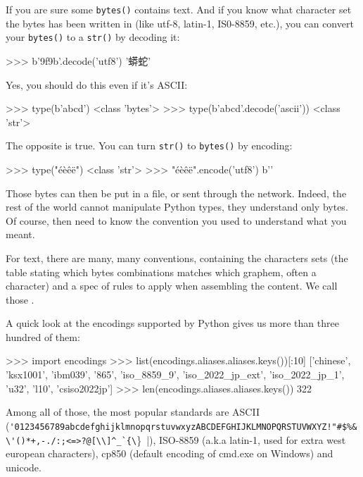 If you are sure some \lstinline{bytes()} contains text. And if you know what character set the bytes has been written in (like utf-8, latin-1, IS0-8859, etc.), you can convert your \lstinline{bytes()} to a \lstinline{str()} by decoding it:

\begin{py3}
>>> b'\x9f\x9b'.decode('utf8')
'蟒蛇'
\end{py3}

Yes, you should do this even if it's ASCII:

\begin{py3}
>>> type(b'abcd')
<class 'bytes'>
>>> type(b'abcd'.decode('ascii'))
<class 'str'>
\end{py3}

The opposite is true. You can turn \lstinline{str()} to \lstinline{bytes()} by encoding:

\begin{py3}
>>> type("éèêë")
<class 'str'>
>>> "éèêë".encode('utf8')
b'\xaa{}\xab'
\end{py3}

Those bytes can then be put in a file, or sent through the network. Indeed, the rest of the world cannot manipulate Python types, they understand only bytes. Of course, then need to know the convention you used to understand what you meant.

For text, there are many, many conventions, containing the characters sets (the table stating which bytes combinations matches which graphem, often a character) and a spec of rules to apply when assembling the content. We call those .

A quick look at the encodings supported by Python gives us more than three hundred of them:

\begin{py3}
>>> import encodings
>>> list(encodings.aliases.aliases.keys())[:10]
['chinese', 'ksx1001', 'ibm039', '865', 'iso_8859_9', 'iso_2022_jp_ext', 'iso_2022_jp_1', 'u32', 'l10', 'csiso2022jp']
>>> len(encodings.aliases.aliases.keys())
322
\end{py3}

Among all of those, the most popular standards are ASCII (\lstinline|'0123456789abcdefghijklmnopqrstuvwxyzABCDEFGHIJKLMNOPQRSTUVWXYZ!"#$%&\'()*+,-./:;<=>?@[\\]^_`{\|\}~|), ISO-8859 (a.k.a latin-1, used for extra west european characters), cp850 (default encoding of cmd.exe on Windows) and unicode.

